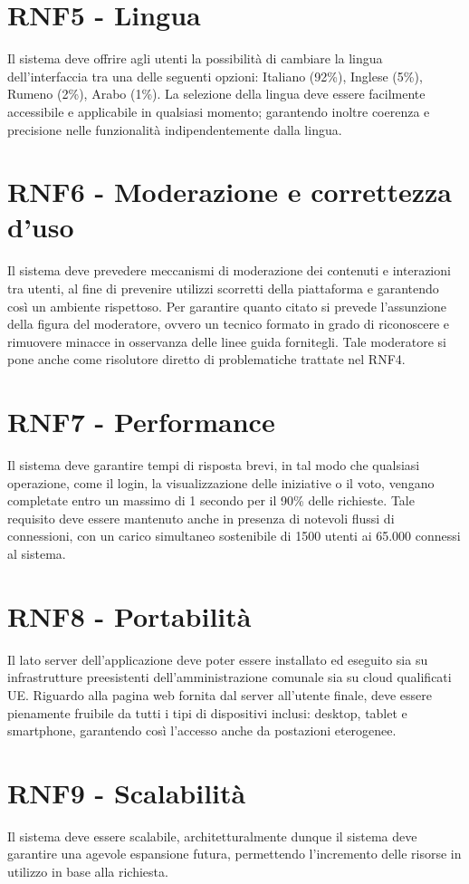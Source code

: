 \section{RNF5 - Lingua}
Il sistema deve offrire agli utenti la possibilità di cambiare la lingua dell’interfaccia tra una delle seguenti opzioni: Italiano (92{\%}), Inglese (5{\%}), Rumeno (2{\%}), Arabo (1{\%}). La selezione della lingua deve essere facilmente accessibile e applicabile in qualsiasi momento; garantendo inoltre coerenza e precisione nelle funzionalità indipendentemente dalla lingua.

\section{RNF6 - Moderazione e correttezza d'uso}
Il sistema deve prevedere meccanismi di moderazione dei contenuti e interazioni tra utenti, al fine di prevenire utilizzi scorretti della piattaforma e garantendo così un ambiente rispettoso. Per garantire quanto citato si prevede l'assunzione della figura del moderatore, ovvero un tecnico formato in grado di riconoscere e rimuovere minacce in osservanza delle linee guida fornitegli. Tale moderatore si pone anche come risolutore diretto di problematiche trattate nel RNF4.

\section{RNF7 - Performance}
Il sistema deve garantire tempi di risposta brevi, in tal modo che qualsiasi operazione, come il login, la visualizzazione delle iniziative o il voto, vengano completate entro un massimo di 1 secondo per il 90{\%} delle richieste. Tale requisito deve essere mantenuto anche in presenza di notevoli flussi di connessioni, con un carico simultaneo sostenibile di 1500 utenti ai 65.000 connessi al sistema.

\section{RNF8 - Portabilità}
Il lato server dell'applicazione deve poter essere installato ed eseguito sia su infrastrutture preesistenti dell’amministrazione comunale sia su cloud qualificati UE. Riguardo alla pagina web fornita dal server all'utente finale, deve essere pienamente fruibile da tutti i tipi di dispositivi inclusi: desktop, tablet e smartphone, garantendo così l’accesso anche da postazioni eterogenee.

\section{RNF9 - Scalabilità}
Il sistema deve essere scalabile, architetturalmente dunque il sistema deve garantire una agevole espansione futura, permettendo l’incremento delle risorse in utilizzo in base alla richiesta.


